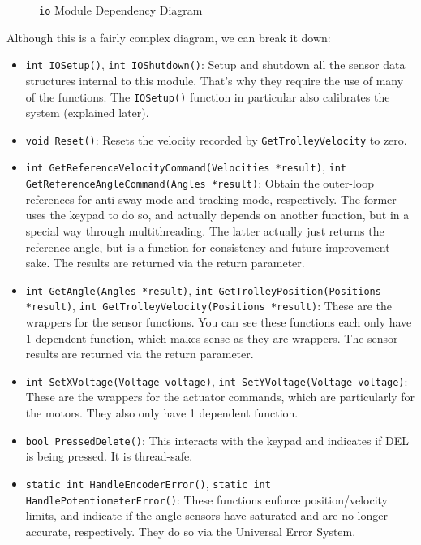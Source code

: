 \documentclass[letterpaper]{article}
\begin{document}
\begin{figure}[H]
\begin{tikzpicture}
    \end{tikzpicture}
    \label{io-mdd}
    \caption{\texttt{io} Module Dependency Diagram}
\end{figure}

Although this is a fairly complex diagram, we can break it down:
\begin{itemize}
    \item \texttt{int IOSetup()}, \texttt{int IOShutdown()}:  Setup and shutdown all the sensor data structures internal to this module. That's why they require the use of many of the functions. The \texttt{IOSetup()} function in particular also calibrates the system (explained later).
    \item \texttt{void Reset()}: Resets the velocity recorded by \texttt{GetTrolleyVelocity} to zero.
    \item \texttt{int GetReferenceVelocityCommand(Velocities *result)}, \texttt{int GetReferenceAngleCommand(Angles *result)}: Obtain the outer-loop references for anti-sway mode and tracking mode, respectively. The former uses the keypad to do so, and actually depends on another function, but in a special way through multithreading. The latter actually just returns the reference angle, but is a function for consistency and future improvement sake. The results are returned via the return parameter.
    \item \texttt{int GetAngle(Angles *result)}, \texttt{int GetTrolleyPosition(Positions *result)}, \break \texttt{int GetTrolleyVelocity(Positions *result)}: These are the wrappers for the sensor functions. You can see these functions each only have 1 dependent function, which makes sense as they are wrappers. The sensor results are returned via the return parameter.
    \item \texttt{int SetXVoltage(Voltage voltage)}, \texttt{int SetYVoltage(Voltage voltage)}: These are the wrappers for the actuator commands, which are particularly for the motors. They also only have 1 dependent function.
    \item \texttt{bool PressedDelete()}: This interacts with the keypad and indicates if DEL is being pressed. It is thread-safe.
    \item \texttt{static int HandleEncoderError()}, \texttt{static int HandlePotentiometerError()}: These functions enforce position/velocity limits, and indicate if the angle sensors have saturated and are no longer accurate, respectively. They do so via the Universal Error System.
\end{itemize}
\end{document}
